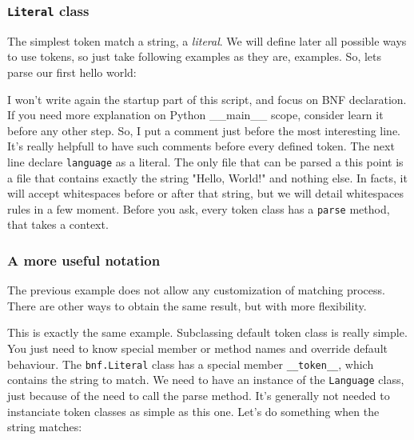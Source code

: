 \documentclass[a4paper]{article}
\begin{document}
            \subsubsection{\texttt{Literal} class}
                The simplest token match a string, a \textit{literal}. We
                will define later all possible ways to use tokens, so just take
                following examples as they are, examples.
                So, lets parse our first hello world:
                

                I won't write again the startup part of this script, and focus on BNF
                declaration. If you need more explanation on Python \_\_main\_\_ scope,
                consider learn it before any other step. So, I put a comment
                just before the most interesting line. It's really helpfull to have
                such comments before every defined token. The next line declare
                \texttt{language} as a literal. The only file that can be parsed a this point
                is a file that contains exactly the string "Hello, World!" and nothing else.
                In facts, it will accept whitespaces before or after that string, but we will
                detail whitespaces rules in a few moment.
                Before you ask, every token class has a \texttt{parse} method, that takes
                a context.

            \subsubsection{A more useful notation}
                The previous example does not allow any customization of matching process.
                There are other ways to obtain the same result, but with more flexibility.
                

                This is exactly the same example. Subclassing default token class is really
                simple. You just need to know special member or method names and override
                default behaviour. The \texttt{bnf.Literal} class has a special member
                \texttt{\_\_token\_\_}, which contains the string to match.
                We need to have an instance of the \texttt{Language} class, just because
                of the need to call the parse method. It's generally not needed to instanciate
                token classes as simple as this one.
                Let's do something when the string matches:
                
\end{document}
